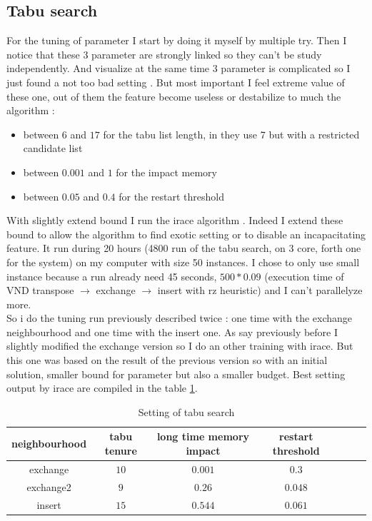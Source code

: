 \documentclass[12pt,a4paper]{article}
\begin{document}
\subsection{Tabu search }

For the tuning of parameter I start by doing it myself by multiple try. Then I notice that these 3 parameter are strongly linked so they can't be study independently. And visualize at the same time 3 parameter is complicated so I just found a not too bad setting . But most important I feel extreme value of these one, out of them the feature become useless or destabilize to much the algorithm :
\begin{itemize}
\item
between $6$ and $17$ for the tabu list length, in \cite{Tseng2010121} they use 7 but with a restricted candidate list
\item
between $0.001$ and $1$ for the impact memory
\item
between $0.05$ and $0.4$ for the restart threshold
\end{itemize}
With slightly extend bound I run the irace algorithm \cite{irace}. Indeed I extend these bound to allow the algorithm to find exotic setting or to disable an incapacitating feature. It run during 20 hours (4800 run of the tabu search, on 3 core, forth one for the system) on my computer with size 50 instances. I chose to only use small instance because a run already need 45 seconds, $500 * 0.09$ (execution time of VND transpose $\rightarrow$ exchange $\rightarrow$ insert with rz heuristic) and I can't parallelyze more.\\

So i do the tuning run previously described twice : one time with the exchange neighbourhood and one time with the insert one. As say previously before I slightly modified the exchange version so I do an other training with irace. But this one was based on the result of the previous version so with an initial solution, smaller bound for parameter but also a smaller budget. Best setting output by irace are compiled in the table \ref{Setting of tabu search}.

\begin{table}[!h]
\centering
\begin{tabular}{|*{7}{c|}}
  \hline
  neighbourhood & tabu tenure & long time memory impact & restart threshold \\
  \hline
  exchange & $10$ & $0.001$ & $0.3$ \\ 
  exchange2 & $9$ & $0.26$ & $0.048$ \\
  insert & $15$ & $0.544$ & $0.061$ \\
  \hline
\end{tabular}
\caption{Setting of tabu search}
\label{Setting of tabu search}
\end{table}
\end{document}
